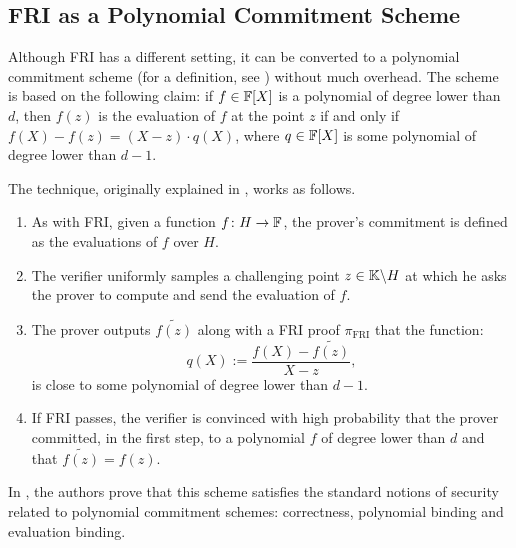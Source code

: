 \subsection*{FRI as a Polynomial Commitment Scheme}

Although FRI has a different setting, it can be converted to a polynomial commitment scheme (for a definition, see \cite{AC:KatZavGol10}) without much overhead. The scheme is based on the following claim: if $f \in \mathbb{F}[X]$ is a polynomial of degree lower than $d$, then $f(z)$ is the evaluation of $f$ at the point $z$ if and only if $f(X) - f(z) = (X - z) \cdot q(X)$, where $q \in \mathbb{F}[X]$ is some polynomial of degree lower than $d-1$. 

The technique, originally explained in \cite{EPRINT:VlaPan19}, works as follows. 
\begin{enumerate}
  \item As with FRI, given a function $f \colon H \to \mathbb{F}$, the prover's commitment is defined as the evaluations of $f$ over $H$. 
  \item The verifier uniformly samples a challenging point $z \in \mathbb{K} \backslash H$ at which he asks the prover to compute and send the evaluation of $f$.
  \item The prover outputs $\widetilde{f(z)}$ along with a FRI proof $\pi_{\text{FRI}}$ that the function:
  \[
    q(X) := \frac{f(X) - \widetilde{f(z)}}{X - z},
  \]
  is close to some polynomial of degree lower than $d-1$.
  \item If FRI passes, the verifier is convinced with high probability that the prover committed, in the first step, to a polynomial $f$ of degree lower than $d$ and that $\widetilde{f(z)} = f(z)$.
  
\end{enumerate} 

In \cite{EPRINT:VlaPan19}, the authors prove that this scheme satisfies the standard notions of security related to polynomial commitment schemes: correctness, polynomial binding and evaluation binding.







